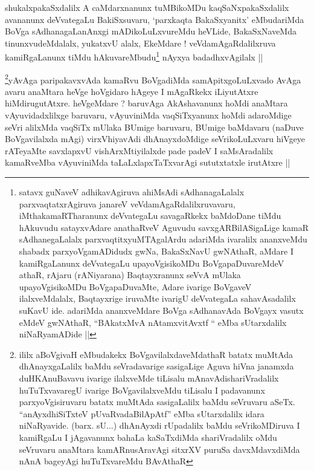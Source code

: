 \begin{artha}
shukalxpakaSxdalilx A caMdarxnanunx tuMBikoMDu kaqSaNxpakaSxdalilx
avananunx deVvategaLu BakiSxsuvaru, `parxkaqta BakaSxyanitx'
eMbudariMda BoVga sAdhanagaLanAnxgi mADikoLuLxvureMdu heVLide,
BakaSxNaveMda tinunxvudeMdalalx, yukatxvU alalx, EkeMdare !
veVdamAgaRdalilxruva kamiRgaLanunx tiMdu hAkuvareMbudu\footnote{satavx
  guNaveV adhikavAgiruva ahiMsAdi sAdhanagaLalalx parxvaqtatxrAgiruva
  janareV veVdamAgaRdalilxruvavaru, iMthakamaRTharanunx deVvategaLu
  savagaRkekx baMdoDane tiMdu hAkuvudu satayxvAdare anathaRveV Aguvudu
  savxgARBilASigaLige kamaR sAdhanegaLalalx parxvaqtitxyuMTAgalArdu
  adariMda ivaralilx ananxveMdu shabadx parxyoVgamADidudx gwNa,
  BakaSxNavU gwNAthaR, aMdare I kamiRgaLanunx deVvategaLu
  upayoVgisikoMDu BoVgapaDuvareMdeV athaR, rAjaru (rANiyarana)
  Baqtayxranunx seVvA mUlaka upayoVgisikoMDu BoVgapaDuvaMte, Adare
  ivarige BoVgaveV ilalxveMdalalx, Baqtayxrige iruvaMte ivarigU
  deVvategaLa sahavAsadalilx suKavU ide. adariMda ananxveMdare BoVga
  sAdhanavAda BoVgayx vasutx eMdeV gwNAthaR, ``BAkatxMvA\s
  nAtamxvitAvxtf `` eMba sUtarxdalilx niNaRyamADide ||} nAyxya badadhxvAgilalx ||
\end{artha}


\begin{artha}
\footnote{ililx aBoVgivaH eMbudakekx BoVgavilalxdaveMdathaR batatx
  muMtAda dhAnayxgaLalilx baMdu seVradavarige sasigaLige Aguva hiVna
  janamxda duHKAnuBavavu ivarige ilalxveMde tiLisalu
  mAnavAdishariVradalilx huTuTxvavaregU ivarige BoVgavilalxveMdu
  tiLisalu I padavanunx parxyoVgisiruvaru batatx muMtAda sasigaLalilx
  baMdu seVruvaru aSeTx. ``anAyxdhiSiTxteV pUvaRvadaBilApAtf'' eMba
  sUtarxdalilx idara niNaRyavide. (barx. sU...) dhAnAyxdi rUpadalilx
  baMdu seVrikoMDiruva I kamiRgaLu I jAgavanunx bahaLa kaSaTxdiMda
  shariVradalilx oMdu seVruvaru anaMtara kamARnusAravAgi sitxrXV
  puruSa davxMdavxdiMda nAnA bageyAgi huTuTxvareMdu BAvAthaR}yAvAga paripakavxvAda kamaRvu BoVgadiMda samApitxgoLuLxvado
AvAga avaru anaMtara heVge hoVgidaro hAgeye I mAgaRkekx iLiyutAtxre
hiMdirugutAtxre. heVgeMdare ? baruvAga AkAshavanunx hoMdi anaMtara
vAyuvidadxlilxge baruvaru, vAyuviniMda vaqSiTxyanunx hoMdi adaroMdige
seVri alilxMda vaqSiTx mUlaka BUmige baruvaru, BUmige baMdavaru (naDuve
BoVgavilalxda mAgi) virxVhiyavAdi dhAnayxdoMdige seVrikoLuLxvaru
hiVgeye rATeyaMte savxlapxvU vishArxMtiyilalxde pade padeV I
saMsAradalilx kamaRveMba vAyuviniMda taLaLxlapxTaTxvarAgi sututxtatxle
irutAtxre ||
\end{artha}

